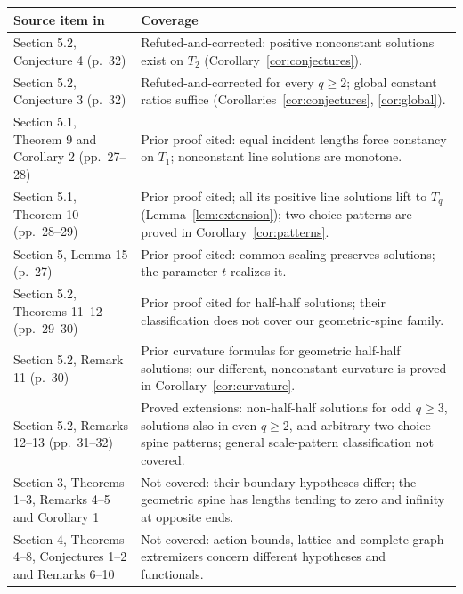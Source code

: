 \documentclass[11pt]{article}
\begin{document}
\begin{center}
\small
\begin{tabular}{@{}p{}p{}@{}}
\toprule
Source item in~\cite{HSXZ} & Coverage\\
\midrule
Section 5.2, Conjecture 4 (p.~32) & Refuted-and-corrected: positive nonconstant solutions exist on $T_2$ (Corollary~\ref{cor:conjectures}).\\
Section 5.2, Conjecture 3 (p.~32) & Refuted-and-corrected for every $q\geq2$; global constant ratios suffice (Corollaries~\ref{cor:conjectures}, \ref{cor:global}).\\
Section 5.1, Theorem 9 and Corollary 2 (pp.~27--28) & Prior proof cited: equal incident lengths force constancy on $T_1$; nonconstant line solutions are monotone.\\
Section 5.1, Theorem 10 (pp.~28--29) & Prior proof cited; all its positive line solutions lift to $T_q$ (Lemma~\ref{lem:extension}); two-choice patterns are proved in Corollary~\ref{cor:patterns}.\\
Section 5, Lemma 15 (p.~27) & Prior proof cited: common scaling preserves solutions; the parameter $t$ realizes it.\\
Section 5.2, Theorems 11--12 (pp.~29--30) & Prior proof cited for half-half solutions; their classification does not cover our geometric-spine family.\\
Section 5.2, Remark 11 (p.~30) & Prior curvature formulas for geometric half-half solutions; our different, nonconstant curvature is proved in Corollary~\ref{cor:curvature}.\\
Section 5.2, Remarks 12--13 (pp.~31--32) & Proved extensions: non-half-half solutions for odd $q\geq3$, solutions also in even $q\geq2$, and arbitrary two-choice spine patterns; general scale-pattern classification not covered.\\
Section 3, Theorems 1--3, Remarks 4--5 and Corollary 1 & Not covered: their boundary hypotheses differ; the geometric spine has lengths tending to zero and infinity at opposite ends.\\
Section 4, Theorems 4--8, Conjectures 1--2 and Remarks 6--10 & Not covered: action bounds, lattice and complete-graph extremizers concern different hypotheses and functionals.\\
\bottomrule
\end{tabular}
\end{center}
\end{document}
